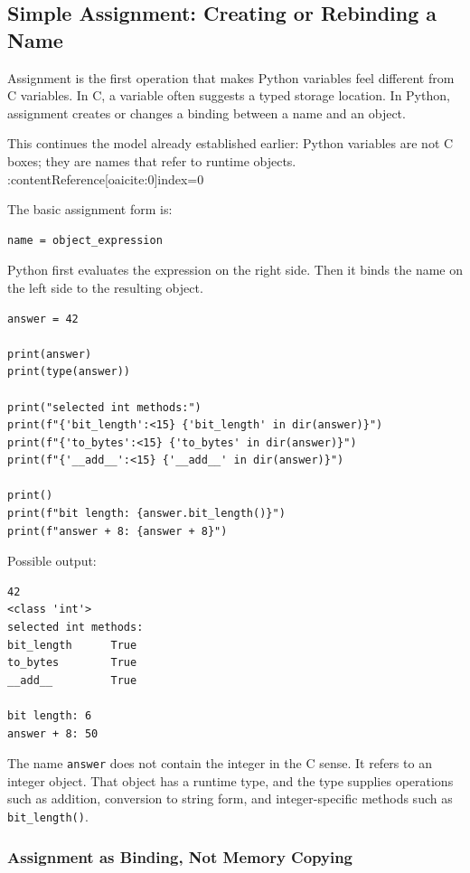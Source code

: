 \subsection{Simple Assignment: Creating or Rebinding a Name}

Assignment is the first operation that makes Python variables feel different from C variables. In C, a variable often suggests a typed storage location. In Python, assignment creates or changes a binding between a name and an object.

This continues the model already established earlier: Python variables are not C boxes; they are names that refer to runtime objects. :contentReference[oaicite:0]{index=0}

The basic assignment form is:

\begin{verbatim}
name = object_expression
\end{verbatim}

Python first evaluates the expression on the right side. Then it binds the name on the left side to the resulting object.

\begin{verbatim}
answer = 42

print(answer)
print(type(answer))

print("selected int methods:")
print(f"{'bit_length':<15} {'bit_length' in dir(answer)}")
print(f"{'to_bytes':<15} {'to_bytes' in dir(answer)}")
print(f"{'__add__':<15} {'__add__' in dir(answer)}")

print()
print(f"bit length: {answer.bit_length()}")
print(f"answer + 8: {answer + 8}")
\end{verbatim}

Possible output:

\begin{verbatim}
42
<class 'int'>
selected int methods:
bit_length      True
to_bytes        True
__add__         True

bit length: 6
answer + 8: 50
\end{verbatim}

The name \texttt{answer} does not contain the integer in the C sense. It refers to an integer object. That object has a runtime type, and the type supplies operations such as addition, conversion to string form, and integer-specific methods such as \texttt{bit\_length()}.

\subsubsection{Assignment as Binding, Not Memory Copying}

